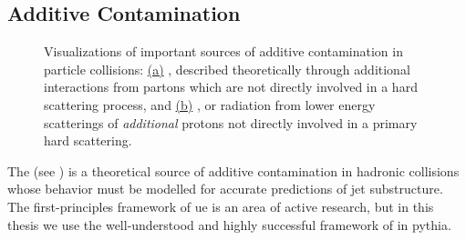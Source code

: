 \begin{subappendices}
\subsection{Additive Contamination}
\label{app:additive-contamination}


\begin{figure}[t]
    \centering
    \caption{Visualizations of important sources of additive contamination in particle collisions:
    \hyperref[fig:app-ue]{(a)}
    , described theoretically through additional interactions from partons which are not directly involved in a hard scattering process, and
    \hyperref[fig:app-pu]{(b)}
    , or radiation from lower energy scatterings of \textit{additional} protons not directly involved in a primary hard scattering.
    }
    \label{fig:app-additive-contamination}
\end{figure}


The  (see ) is a theoretical source of additive contamination in hadronic collisions whose behavior must be modelled for accurate predictions of jet substructure.
%
The first-principles framework of \gls{ue} is an area of active research, but in this thesis we use the well-understood and highly successful framework of \textit{} in \gls{pythia}.


\end{subappendices}
